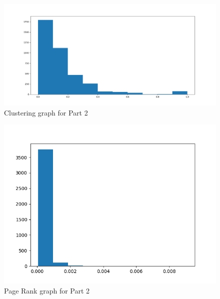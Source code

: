 \documentclass{article}
\begin{document}
\begin{figure}
    \centering
    \includegraphics[width=\textwidth,height=\textheight,keepaspectratio]{clustering.png}
    \caption{Clustering graph for Part 2}
    \label{fig:part2clustering}
\end{figure}

\begin{figure}
    \centering
    \includegraphics[width=\textwidth,height=\textheight,keepaspectratio]{page_rank.png}
    \caption{Page Rank graph for Part 2}
    \label{fig:part2pagerank}
\end{figure}
\end{document}
